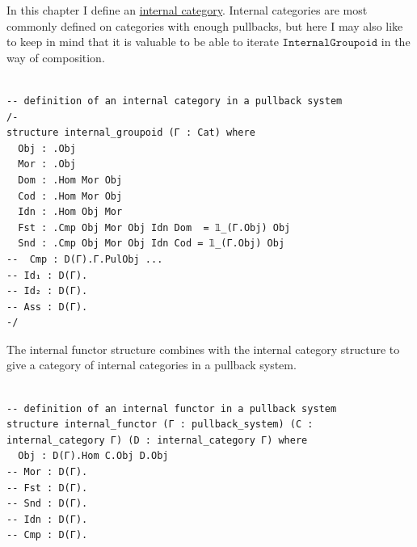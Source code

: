 \documentclass{book}
\theoremstyle{definition}
\newcounter{lcounter}
\begin{document}
In this chapter I define an \href{https://ncatlab.org/nlab/show/internal+category}{internal category}. Internal categories are most commonly defined on categories with enough pullbacks, but here I may also like to keep in mind that it is valuable to be able to iterate $\texttt{InternalGroupoid}$ in the way of composition.\\

\begin{center}
\begin{tcolorbox}[width=5in,colback={white},title={\begin{center}\texttt{Lean \thelcounter} \addtocounter{lcounter}{1}  \end{center}},colbacktitle=Blue,coltitle=black]
\begin{verbatim}

-- definition of an internal category in a pullback system
/-
structure internal_groupoid (Γ : Cat) where
  Obj : .Obj
  Mor : .Obj
  Dom : .Hom Mor Obj
  Cod : .Hom Mor Obj
  Idn : .Hom Obj Mor
  Fst : .Cmp Obj Mor Obj Idn Dom  = 𝟙_(Γ.Obj) Obj
  Snd : .Cmp Obj Mor Obj Idn Cod = 𝟙_(Γ.Obj) Obj
--  Cmp : D(Γ).Γ.PulObj ...
-- Id₁ : D(Γ).
-- Id₂ : D(Γ).
-- Ass : D(Γ).
-/

\end{verbatim}
\end{tcolorbox}
\end{center}

The internal functor structure combines with the internal category structure to give a category of internal categories in a pullback system.\\

\begin{center}
\begin{tcolorbox}[width=5in,colback={white},title={\begin{center}\texttt{Lean \thelcounter} \addtocounter{lcounter}{1}  \end{center}},colbacktitle=Blue,coltitle=black]
\begin{verbatim}

-- definition of an internal functor in a pullback system
structure internal_functor (Γ : pullback_system) (C : internal_category Γ) (D : internal_category Γ) where
  Obj : D(Γ).Hom C.Obj D.Obj
-- Mor : D(Γ).
-- Fst : D(Γ).
-- Snd : D(Γ).
-- Idn : D(Γ).
-- Cmp : D(Γ).

\end{verbatim}
\end{tcolorbox}
\end{center}
\end{document}
